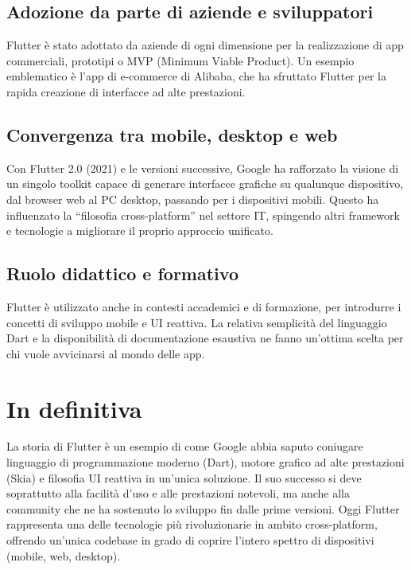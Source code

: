\documentclass[14pt]{extbook}
\begin{document}
\subsection{Adozione da parte di aziende e sviluppatori}
Flutter è stato adottato da aziende di ogni dimensione per la realizzazione di app commerciali, prototipi o MVP (Minimum Viable Product). Un esempio emblematico è l’app di e-commerce di Alibaba, che ha sfruttato Flutter per la rapida creazione di interfacce ad alte prestazioni.\\

\subsection{Convergenza tra mobile, desktop e web}
Con Flutter 2.0 (2021) e le versioni successive, Google ha rafforzato la visione di un singolo toolkit capace di generare interfacce grafiche su qualunque dispositivo, dal browser web al PC desktop, passando per i dispositivi mobili. Questo ha influenzato la “filosofia cross-platform” nel settore IT, spingendo altri framework e tecnologie a migliorare il proprio approccio unificato.\\

\subsection{Ruolo didattico e formativo}
Flutter è utilizzato anche in contesti accademici e di formazione, per introdurre i concetti di sviluppo mobile e UI reattiva. La relativa semplicità del linguaggio Dart e la disponibilità di documentazione esaustiva ne fanno un’ottima scelta per chi vuole avvicinarsi al mondo delle app.\\

\section{In definitiva}
La storia di Flutter è un esempio di come Google abbia saputo coniugare linguaggio di programmazione moderno (Dart), motore grafico ad alte prestazioni (Skia) e filosofia UI reattiva in un’unica soluzione. Il suo successo si deve soprattutto alla facilità d’uso e alle prestazioni notevoli, ma anche alla community che ne ha sostenuto lo sviluppo fin dalle prime versioni. Oggi Flutter rappresenta una delle tecnologie più rivoluzionarie in ambito cross-platform, offrendo un’unica codebase in grado di coprire l’intero spettro di dispositivi (mobile, web, desktop).
\end{document}
